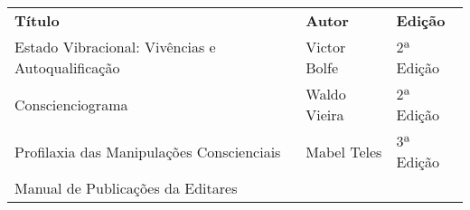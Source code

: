 \documentclass[
]{article}
\begin{document}
\begin{longtable}[]{@{}
  >{\raggedright\arraybackslash}p{}
  >{\raggedright\arraybackslash}p{}
  >{\raggedright\arraybackslash}p{}@{}}
\toprule\noalign{}
\begin{minipage}[b]{\linewidth}\centering
\textbf{Título}
\end{minipage} & \begin{minipage}[b]{\linewidth}\centering
\textbf{Autor}
\end{minipage} & \begin{minipage}[b]{\linewidth}\centering
\textbf{Edição}
\end{minipage} \\
\begin{minipage}[b]{\linewidth}\raggedright
Estado Vibracional: Vivências e Autoqualificação
\end{minipage} & \begin{minipage}[b]{\linewidth}\raggedright
Victor Bolfe
\end{minipage} & \begin{minipage}[b]{\linewidth}\raggedright
2ª Edição
\end{minipage} \\
\begin{minipage}[b]{\linewidth}\raggedright
Conscienciograma
\end{minipage} & \begin{minipage}[b]{\linewidth}\raggedright
Waldo Vieira
\end{minipage} & \begin{minipage}[b]{\linewidth}\raggedright
2ª Edição
\end{minipage} \\
\begin{minipage}[b]{\linewidth}\raggedright
Profilaxia das Manipulações Conscienciais
\end{minipage} & \begin{minipage}[b]{\linewidth}\raggedright
Mabel Teles
\end{minipage} & \begin{minipage}[b]{\linewidth}\raggedright
3ª Edição
\end{minipage} \\
\begin{minipage}[b]{\linewidth}\raggedright
Manual de Publicações da Editares
\end{minipage} & \begin{minipage}[b]{\linewidth}\raggedright

\end{minipage}
\end{longtable}
\end{document}
